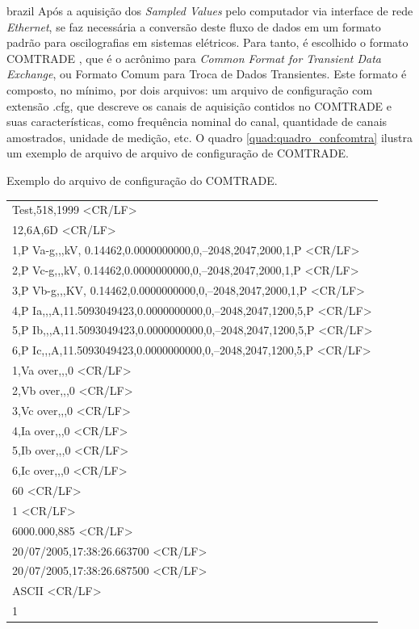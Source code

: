 \begin{otherlanguage*}{brazil}
Após a aquisição dos \textit{Sampled Values} pelo computador via interface de rede \textit{Ethernet}, se faz necessária a conversão deste fluxo de dados em um formato padrão para oscilografias em sistemas elétricos. Para tanto, é escolhido o formato COMTRADE \cite{comtrade1992} \cite{C37.111-2013}, que é o acrônimo para \textit{Common Format for Transient Data Exchange}, ou Formato Comum para Troca de Dados Transientes. Este formato é composto, no mínimo, por dois arquivos: um arquivo de configuração com extensão .cfg, que descreve os canais de aquisição contidos no COMTRADE e suas características, como frequência nominal do canal, quantidade de canais amostrados, unidade de medição, etc. O quadro \ref{quad:quadro_confcomtra} ilustra um exemplo de arquivo de arquivo de configuração de COMTRADE.

\begin{quadro}[htb]
\caption[Exemplo do arquivo de configuração do COMTRADE]{Exemplo do arquivo de configuração do COMTRADE.}
\label{quad:quadro_confcomtra}
\begin{tabular}{|l|}
Test,518,1999 <CR/LF>\\
12,6A,6D <CR/LF>\\
1,P Va-g,,,kV, 0.14462,0.0000000000,0,–2048,2047,2000,1,P <CR/LF>\\
2,P Vc-g,,,kV, 0.14462,0.0000000000,0,–2048,2047,2000,1,P <CR/LF>\\
3,P Vb-g,,,KV, 0.14462,0.0000000000,0,–2048,2047,2000,1,P <CR/LF>\\
4,P Ia,,,A,11.5093049423,0.0000000000,0,–2048,2047,1200,5,P <CR/LF>\\
5,P Ib,,,A,11.5093049423,0.0000000000,0,–2048,2047,1200,5,P <CR/LF>\\
6,P Ic,,,A,11.5093049423,0.0000000000,0,–2048,2047,1200,5,P <CR/LF>\\
1,Va over,,,0 <CR/LF>\\
2,Vb over,,,0 <CR/LF>\\
3,Vc over,,,0 <CR/LF>\\
4,Ia over,,,0 <CR/LF>\\
5,Ib over,,,0 <CR/LF>\\
6,Ic over,,,0 <CR/LF>\\
60 <CR/LF>\\
1 <CR/LF>\\
6000.000,885 <CR/LF>\\
20/07/2005,17:38:26.663700 <CR/LF>\\
20/07/2005,17:38:26.687500 <CR/LF>\\
ASCII <CR/LF>\\
1\\
\hline
\end{tabular}
\end{quadro}


\end{otherlanguage*}
